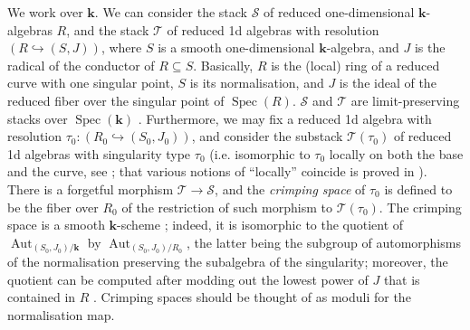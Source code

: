 \documentclass[11pt]{amsart}
\renewcommand{\k}{\mathbf k}
\renewcommand{\to}{\rightarrow}
\newcommand{\Aut}{\operatorname{Aut}}
\theoremstyle{plain}
\theoremstyle{definition}
\begin{document}
We work over $\k$. We can consider the stack $\mathcal S$ of reduced one-dimensional $\k$-algebras $R$, and the stack $\mathcal T$ of reduced 1d algebras with resolution $(R\hookrightarrow (S,J))$, where $S$ is a smooth one-dimensional $\k$-algebra, and $J$ is the radical of the conductor of $R\subseteq S$. Basically, $R$ is the (local) ring of a reduced curve with one singular point, $S$ is its normalisation, and $J$ is the ideal of the reduced fiber over the singular point of $\operatorname{Spec}(R)$. $\mathcal S$ and $\mathcal T$ are limit-preserving stacks over $\operatorname{Spec}(\k)$ \cite[Proposition 1.21]{vdW}. Furthermore, we may fix a reduced 1d algebra with resolution $\tau_0:(R_0\hookrightarrow(S_0,J_0))$, and consider the substack $\mathcal T(\tau_0)$ of reduced 1d algebras with singularity type $\tau_0$ (i.e. isomorphic to $\tau_0$ locally on both the base and the curve, see \cite[Definition 1.64]{vdW}; that various notions of ``locally'' coincide is proved in \cite[Proposition 1.50]{vdW}). There is a forgetful morphism $\mathcal T\to\mathcal S$, and the \emph{crimping space} of $\tau_0$ is defined to be the fiber over $R_0$ of the restriction of such morphism to $\mathcal T(\tau_0)$. The crimping space is a smooth $\k$-scheme \cite[Theorems 1.70 and 1.73]{vdW}; indeed, it is isomorphic to the quotient of $\Aut_{(S_0,J_0)/\k}$ by $\Aut_{(S_0,J_0)/R_0}$, the latter being the subgroup of automorphisms of the normalisation preserving the subalgebra of the singularity; moreover, the quotient can be computed after modding out the lowest power of $J$ that is contained in $R$ \cite[Theorem 1.53]{vdW}. Crimping spaces should be thought of as moduli for the normalisation map. %
\end{document}
